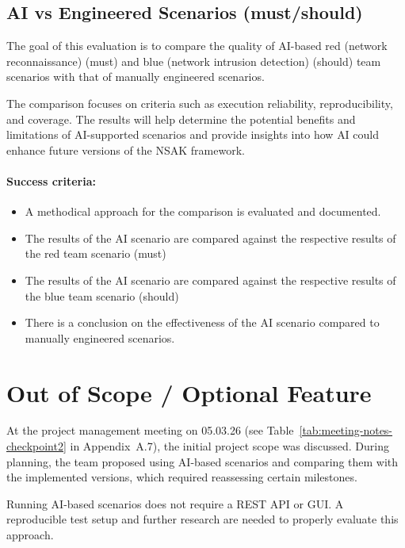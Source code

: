 \subsection{\gls{AI} vs Engineered Scenarios (must/should)}\label{subsec:ai-vs-engineered-scenarios}

The goal of this evaluation is to compare the quality of \gls{AI}-based red (network reconnaissance) (must) and blue (network intrusion detection) (should) team scenarios with that of manually engineered scenarios.

The comparison focuses on criteria such as execution reliability, reproducibility, and coverage.
The results will help determine the potential benefits and limitations of \gls{AI}-supported scenarios and provide insights into how \gls{AI} could enhance future versions of the \gls{NSAK} framework.

\paragraph{Success criteria:}

\begin{itemize}
	\item A methodical approach for the comparison is evaluated and documented.
	\item The results of the \gls{AI} scenario are compared against the respective results of the red team scenario (must)
	\item The results of the \gls{AI} scenario are compared against the respective results of the blue team scenario (should)
	\item There is a conclusion on the effectiveness of the \gls{AI} scenario compared to manually engineered scenarios.
\end{itemize}

\section{Out of Scope / Optional Feature}\label{sec:out-of-scope-optional-feature}

At the project management meeting on 05.03.26 (see Table~\ref{tab:meeting-notes-checkpoint2} in Appendix~A.7), the initial project scope was discussed.
During planning, the team proposed using \gls{AI}-based scenarios and comparing them with the implemented versions, which required reassessing certain milestones.

Running \gls{AI}-based scenarios does not require a REST \gls{API} or \gls{GUI}.
A reproducible test setup and further research are needed to properly evaluate this approach.
